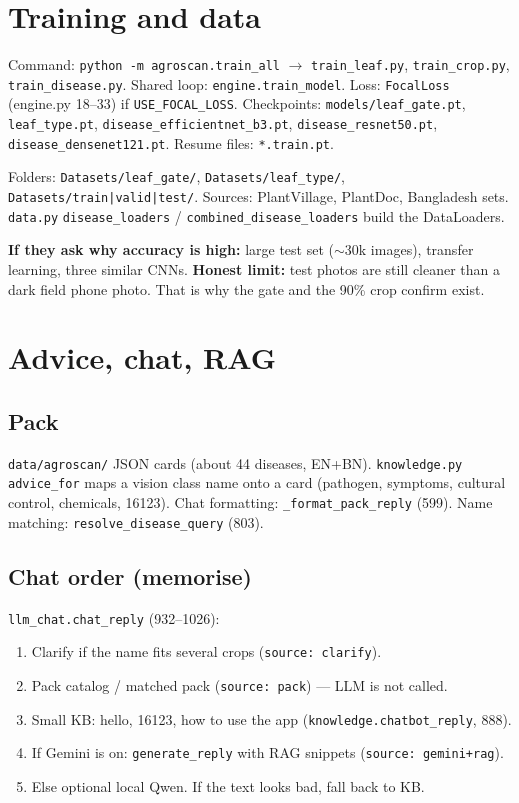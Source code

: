 \documentclass[Times,11pt,oneside,openany]{report}
\begin{document}
\chapter{Training and data}
Command: \texttt{python -m agroscan.train\_all} $\rightarrow$ \texttt{train\_leaf.py}, \texttt{train\_crop.py}, \texttt{train\_disease.py}. Shared loop: \texttt{engine.train\_model}. Loss: \texttt{FocalLoss} (engine.py 18--33) if \texttt{USE\_FOCAL\_LOSS}. Checkpoints: \texttt{models/leaf\_gate.pt}, \texttt{leaf\_type.pt}, \texttt{disease\_efficientnet\_b3.pt}, \texttt{disease\_resnet50.pt}, \texttt{disease\_densenet121.pt}. Resume files: \texttt{*.train.pt}.

Folders: \texttt{Datasets/leaf\_gate/}, \texttt{Datasets/leaf\_type/}, \texttt{Datasets/train|valid|test/}. Sources: PlantVillage, PlantDoc, Bangladesh sets. \texttt{data.py} \texttt{disease\_loaders} / \texttt{combined\_disease\_loaders} build the DataLoaders.

\textbf{If they ask why accuracy is high:} large test set ($\sim$30k images), transfer learning, three similar CNNs. \textbf{Honest limit:} test photos are still cleaner than a dark field phone photo. That is why the gate and the 90\% crop confirm exist.

\chapter{Advice, chat, RAG}
\section{Pack}
\texttt{data/agroscan/} JSON cards (about 44 diseases, EN+BN). \texttt{knowledge.py} \texttt{advice\_for} maps a vision class name onto a card (pathogen, symptoms, cultural control, chemicals, 16123). Chat formatting: \texttt{\_format\_pack\_reply} (599). Name matching: \texttt{resolve\_disease\_query} (803).

\section{Chat order (memorise)}
\texttt{llm\_chat.chat\_reply} (932--1026):
\begin{enumerate}
    \item Clarify if the name fits several crops (\texttt{source: clarify}).
    \item Pack catalog / matched pack (\texttt{source: pack}) --- LLM is not called.
    \item Small KB: hello, 16123, how to use the app (\texttt{knowledge.chatbot\_reply}, 888).
    \item If Gemini is on: \texttt{generate\_reply} with RAG snippets (\texttt{source: gemini+rag}).
    \item Else optional local Qwen. If the text looks bad, fall back to KB.
\end{enumerate}
\end{document}
